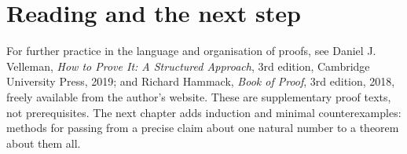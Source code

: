 \section*{Reading and the next step}
For further practice in the language and organisation of proofs, see Daniel J. Velleman,
\emph{How to Prove It: A Structured Approach}, 3rd edition, Cambridge University Press,
2019; and Richard Hammack, \emph{Book of Proof}, 3rd edition, 2018, freely available
from the author's website. These are supplementary proof texts, not prerequisites.
The next chapter adds induction and minimal counterexamples: methods for passing
from a precise claim about one natural number to a theorem about them all.

